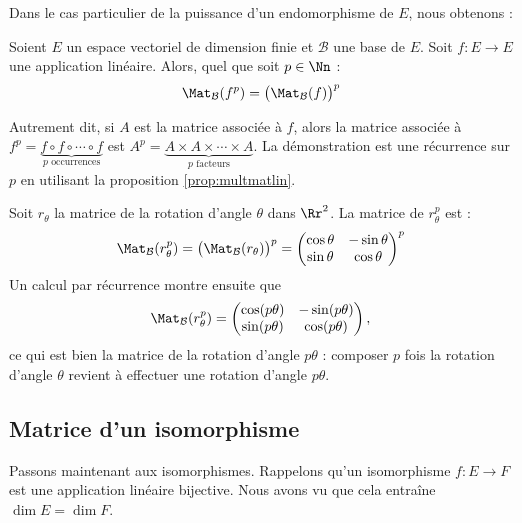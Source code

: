 \documentclass[class=report,crop=false]{standalone}
\begin{document}
Dans le cas particulier de la puissance d'un endomorphisme de $E$,
nous obtenons :
\begin{corollaire}
Soient $E$ un espace vectoriel de dimension finie et $\mathcal{B}$ une base de $E$.
Soit $f :  E \to E$ une application linéaire.
Alors, quel que soit $p \in \Nn$ :
$$\Mat_{\mathcal{B}} (f^p) = \big( \Mat_{\mathcal{B}} (f) \big)^p$$
\end{corollaire}


Autrement dit, si $A$ est la matrice associée à $f$, alors
la matrice associée à $f^p = \underbrace{f \circ f \circ\cdots \circ f}_{p \text{ occurrences}} $
est $A^p = \underbrace{A \times A \times \cdots \times A}_{p \text{ facteurs}}$.
La démonstration est une récurrence sur $p$ en utilisant la
proposition \ref{prop:multmatlin}.

\begin{exemple}
Soit $r_\theta$ la matrice de la rotation d'angle $\theta$ dans $\Rr^2$.
La matrice de $r_\theta^p$  est :
$$\Mat_{\mathcal{B}} (r_\theta^p) = \big( \Mat_{\mathcal{B}} (r_\theta) \big)^p
=  \begin{pmatrix}
\cos\theta & -\sin\theta\\
\sin\theta & \cos\theta
\end{pmatrix}^p$$
Un calcul par récurrence montre ensuite
que $$\Mat_{\mathcal{B}} (r_\theta^p)
= \begin{pmatrix}
\cos(p\theta) & -\sin(p\theta)\\
\sin(p\theta) & \cos(p\theta)
\end{pmatrix},$$
ce qui est bien la matrice de la rotation d'angle $p \theta$ :
composer $p$ fois la rotation d'angle $\theta$ revient à
effectuer une rotation d'angle $p\theta$.
\end{exemple}



\subsection{Matrice d'un isomorphisme}


Passons maintenant aux isomorphismes. Rappelons qu'un isomorphisme
$f : E \to F$ est une application linéaire bijective. 
Nous avons vu que cela entraîne
$\dim E = \dim F$.
\end{document}
